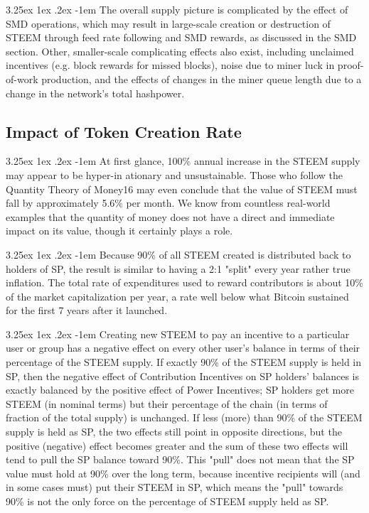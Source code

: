 \documentclass{article}
\makeatletter
\renewcommand\paragraph{\@startsection{paragraph}{5}{\z@}%
  {3.25ex \@plus1ex \@minus.2ex}%
  {-1em}%
  {\normalfont\normalsize\bfseries}}
\makeatother
\begin{document}
		\paragraph{}
			The overall supply picture is complicated by the effect of SMD operations, which may result in large-scale creation or destruction of STEEM through feed rate following and SMD rewards, as discussed in the SMD section. Other, smaller-scale complicating effects also exist, including unclaimed incentives (e.g. block rewards for missed blocks), noise due to miner luck in proof-of-work production, and the effects of changes in the miner queue length due to a change in the network's total hashpower.

		\subsection{Impact of Token Creation Rate}

			\paragraph{}
				At first glance, 100\% annual increase in the STEEM supply may appear to be hyper-in ationary and unsustainable. Those who follow the Quantity Theory of Money16 may even conclude that the value of STEEM must fall by approximately 5.6\% per month. We know from countless real-world examples that the quantity of money does not have a direct and immediate impact on its value, though it certainly plays a role.

			\paragraph{}
				Because 90\% of all STEEM created is distributed back to holders of SP, the result is similar to having a 2:1 "split" every year rather true inflation. The total rate of expenditures used to reward contributors is about 10\% of the market capitalization per year, a rate well below what Bitcoin sustained for the first 7 years after it launched.

			\paragraph{}
				Creating new STEEM to pay an incentive to a particular user or group has a negative effect on every other user's balance in terms of their percentage of the STEEM supply. If exactly 90\% of the STEEM supply is held in SP, then the negative effect of Contribution Incentives on SP holders' balances is exactly balanced by the positive effect of Power Incentives; SP holders get more STEEM (in nominal terms) but their percentage of the chain (in terms of fraction of the total supply) is unchanged. If less (more) than 90\% of the STEEM supply is held as SP, the two effects still point in opposite directions, but the positive (negative) effect becomes greater and the sum of these two effects will tend to pull the SP balance toward 90\%. This "pull" does not mean that the SP value must hold at 90\% over the long term, because incentive recipients will (and in some cases must) put their STEEM in SP, which means the "pull" towards 90\% is not the only force on the percentage of STEEM supply held as SP.
\end{document}
